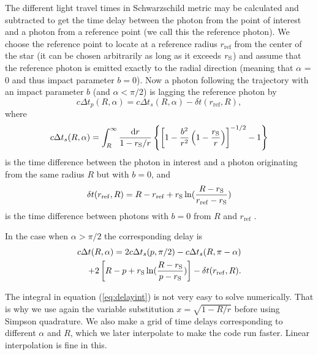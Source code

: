 \documentclass{wihuri}
\def\rg{r_{\rm S}} %
\def\be{\begin{equation}}
\def\ee{\end{equation}}
\def\d{{\rm d}}
\def\rg{r_{\rm S}} %
\begin{document}
The different light travel times in Schwarzschild metric may be calculated and subtracted to get the time delay between the photon from the point of interest and a photon from a reference point (we call this the reference photon). We choose the reference point to locate at a reference radius $r_{\mathrm{ref}}$ from the center of the star (it can be chosen arbitrarily as long as it exceeds $\rg$) and assume that the reference photon is emitted exactly to the radial direction (meaning that $\alpha$ = 0 and thus impact parameter $b = 0$). Now a photon following the trajectory with an impact parameter $b$ (and $\alpha < \pi/2$) is lagging the reference photon by 
\cite{pechenick}
\be \label{eq:delay2}
c\Delta t_{p}(R,\alpha)=  c\Delta t_{s}(R,\alpha) -\delta t(r_{\mathrm{ref}},R),
\ee
where 
\be \label{eq:delayint}
c\Delta t_{s}(R,\alpha) =
\int_R^{\infty} \frac{\d r}{1- \rg/r}
\left\{ \left[ 1-  \frac{b^2}{r^2}  \left( 1- \frac{\rg}{r} \right)
\right] ^{-1/2}  -1 \right\}
\ee
is the time difference between the photon in interest and a photon originating from the same radius $R$ but with $b=0$, and
\be
\delta t(r_{\mathrm{ref}},R) = R-r_{\mathrm{ref}}+\rg\ln(\frac{R-\rg}{r_{\mathrm{ref}}-\rg})
\ee
is the time difference between photons with $b=0$ from $R$ and $r_{\mathrm{ref}}$ \cite{falkner}. 

In the case when $\alpha > \pi/2$ the corresponding delay is
\be\label{eq:delay22}
\begin{split}
c\Delta t(R,\alpha)= 2c\Delta t_{s}(p,\pi/2)-c\Delta t_{s}(R,\pi-\alpha)\\+2\left[ R-p+\rg\ln(\frac{R-\rg}{p-\rg})\right]-\delta t(r_{\mathrm{ref}},R).
\end{split}
\ee

The integral in equation (\ref{eq:delayint}) is not very easy to solve numerically. That is why we use again the variable substitution $x = \sqrt{1-R/r}$ before using Simpson quadrature. We also make a grid of time delays corresponding to different $\alpha$ and $R$, which we later interpolate to make the code run faster. Linear interpolation is fine in this.
\end{document}
